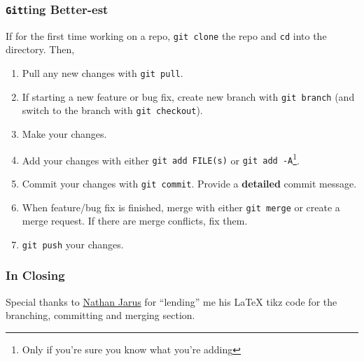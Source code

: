 \documentclass{beamer}
\newcounter{branching}
\newcounter{committing}
\newcounter{merging}
\newcounter{conflicts}
\newcommand{\shellcmd}[1]{\texttt{\colorbox{gray!30}{#1}}}
\begin{document}
\begin{frame}
    \frametitle{\shellcmd{Git}ting Better-est}

    If for the first time working on a repo, \shellcmd{git clone} the repo and \shellcmd{cd} into the directory. Then,

    \begin{enumerate}
        \item Pull any new changes with \shellcmd{git pull}.
        \item If starting a new feature or bug fix, create new branch with \shellcmd{git branch} (and switch to the branch with \shellcmd{git checkout}).
        \item Make your changes.
        \item Add your changes with either \shellcmd{git add FILE(s)} or \shellcmd{git add -A}\footnote{Only if you're sure you know what you're adding}.
        \item Commit your changes with \shellcmd{git commit}. Provide a \textbf{detailed} commit message.
        \item When feature/bug fix is finished, merge with either \shellcmd{git merge} or create a merge request. If there are merge conflicts, fix them.
        \item \shellcmd{git push} your changes.
    \end{enumerate}

\end{frame}


\begin{frame}
    \frametitle{In Closing}
    Special thanks to \href{http://web.mst.edu/~nmjxv3/}{Nathan Jarus} for ``lending'' me his \LaTeX{} tikz code for the branching, committing and merging section.

\end{frame}
\end{document}
